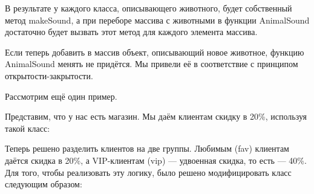 \documentclass[a4paper]{article}
\begin{document}
В результате у каждого класса, описывающего животного, будет собственный метод makeSound, а при переборе массива с животными в функции AnimalSound достаточно будет вызвать этот метод для каждого элемента массива.

Если теперь добавить в массив объект, описывающий новое животное, функцию AnimalSound менять не придётся. Мы привели её в соответствие с принципом открытости-закрытости.

Рассмотрим ещё один пример.

\newpage
Представим, что у нас есть магазин. Мы даём клиентам скидку в 20\%, используя такой класс:

\begin{figure}[h]
\end{figure}

Теперь решено разделить клиентов на две группы. Любимым (fav) клиентам даётся скидка в 20\%, а VIP-клиентам (vip) — удвоенная скидка, то есть — 40\%. Для того, чтобы реализовать эту логику, было решено модифицировать класс следующим образом:

\begin{figure}[h]
\end{figure}
\end{document}
